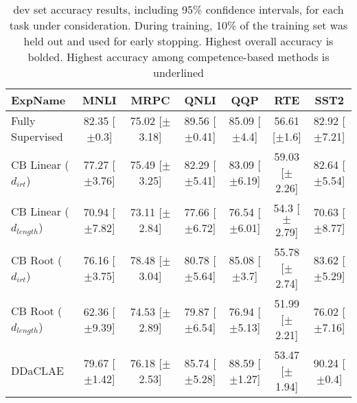 \begin{table*}[ht]
\centering
\begingroup\small
\begin{tabular}{lcccccc}
  \toprule
ExpName & MNLI & MRPC & QNLI & QQP & RTE & SST2 \\ 
  \midrule
Fully Supervised & 82.35 [$\pm$0.3] & 75.02 [$\pm$3.18] & 89.56 [$\pm$0.41] & 85.09 [$\pm$4.4] & 56.61 [$\pm$1.6] & 82.92 [$\pm$7.21] \\ 
  CB Linear ($d_{irt}$) & 77.27 [$\pm$3.76] & 75.49 [$\pm$3.25] & 82.29 [$\pm$5.41] & 83.09 [$\pm$6.19] & 59.03 [$\pm$2.26] & 82.64 [$\pm$5.54] \\ 
  CB Linear ($d_{length}$) & 70.94 [$\pm$7.82] & 73.11 [$\pm$2.84] & 77.66 [$\pm$6.72] & 76.54 [$\pm$6.01] & 54.3 [$\pm$2.79] & 70.63 [$\pm$8.77] \\ 
  CB Root ($d_{irt}$) & 76.16 [$\pm$3.75] & 78.48 [$\pm$3.04] & 80.78 [$\pm$5.64] & 85.08 [$\pm$3.7] & 55.78 [$\pm$2.74] & 83.62 [$\pm$5.29] \\ 
  CB Root ($d_{length}$) & 62.36 [$\pm$9.39] & 74.53 [$\pm$2.89] & 79.87 [$\pm$6.54] & 76.94 [$\pm$5.13] & 51.99 [$\pm$2.21] & 76.02 [$\pm$7.16] \\ 
  DDaCLAE & 79.67 [$\pm$1.42] & 76.18 [$\pm$2.53] & 85.74 [$\pm$5.28] & 88.59 [$\pm$1.27] & 53.47 [$\pm$1.94] & 90.24 [$\pm$0.4] \\ 
   \bottomrule
\end{tabular}
\endgroup
\caption{dev set accuracy results, including 95\% confidence intervals, for each task under consideration. During training, 10\% of the training set was held out and used for early stopping. Highest overall accuracy is bolded. Highest accuracy among competence-based methods is underlined} 
\label{tab:acc_bert-False}
\end{table*}
